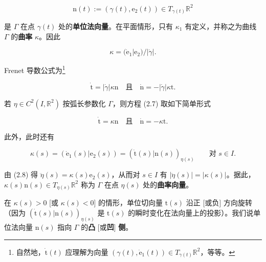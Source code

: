 \[
\mathrm{n}(t) := (\gamma(t), \mathrm{e}_{2}(t)) \in T_{\gamma(t)}\mathbb{R}^{2}
\]

是 $ \Gamma $ 在点 $ \gamma(t) $ 处的\textbf{单位法向量}。在平面情形，只有 $ \kappa_{1} $ 有定义，并称之为曲线 $ \Gamma $ 的\textbf{曲率} $ \kappa $。因此

\begin{equation}
\kappa = (\dot{\mathrm{e}}_{1}|\mathrm{e}_{2})/|\dot{\gamma}| .\tag{2.6}
\end{equation}

\begin{remark}

\begin{items}
\item

Frenet 导数公式为\footnote{自然地，$ \dot{\mathrm{t}}(t) $ 应理解为向量 $ (\gamma(t), \dot{\mathrm{e}}_{1}(t)) \in T_{\gamma(t)}\mathbb{R}^{2} $，等等。}

\begin{equation}
\dot{\mathrm{t}} = |\dot{\gamma}|\kappa\mathrm{n} \quad \text{且} \quad \dot{\mathrm{n}} = -|\dot{\gamma}|\kappa\mathrm{t} .\tag{2.7}
\end{equation}

若 $ \eta \in C^{2}(I, \mathbb{R}^{2}) $ 按弧长参数化 $ \Gamma $，则方程 (2.7) 取如下简单形式

\begin{equation}
\dot{\mathrm{t}} = \kappa\mathrm{n} \quad \text{且} \quad \dot{\mathrm{n}} = -\kappa\mathrm{t} .\tag{2.8}
\end{equation}

此外，此时还有

\[
\kappa(s) = (\dot{\mathrm{e}}_{1}(s)|\mathrm{e}_{2}(s)) = (\dot{\mathrm{t}}(s)|\mathrm{n}(s))_{\eta(s)} \qquad \text{对 } s \in I .
\]

由 (2.8) 得 $ \ddot{\eta}(s) = \kappa(s)\mathrm{e}_{2}(s) $，从而对 $ s \in I $ 有 $ |\ddot{\eta}(s)| = |\kappa(s)| $。据此，$ \kappa(s)\mathrm{n}(s) \in T_{\eta(s)}\mathbb{R}^{2} $ 称为 $ \Gamma $ 在点 $ \eta(s) $ 处的\textbf{曲率向量}。

\end{items}


在 $ \kappa(s) > 0 $ [或 $ \kappa(s) < 0 $] 的情形，单位切向量 $ \mathrm{t}(s) $ 沿正 [或负] 方向旋转（因为 $ (\dot{\mathrm{t}}(s)|\mathrm{n}(s))_{\eta(s)} $ 是 $ \mathrm{t}(s) $ 的瞬时变化在法向量上的投影）。我们说单位法向量 $ \mathrm{n}(s) $ 指向 $ \Gamma $ 的\textbf{凸} [或\textbf{凹}] \textbf{侧}。


\end{remark}

